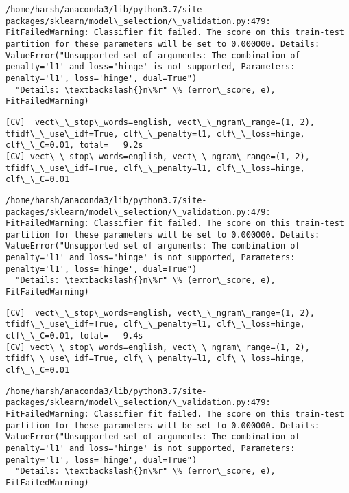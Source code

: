 \documentclass[11pt]{article}
\begin{document}
    \begin{Verbatim}[commandchars=\\\{\}]
/home/harsh/anaconda3/lib/python3.7/site-packages/sklearn/model\_selection/\_validation.py:479: FitFailedWarning: Classifier fit failed. The score on this train-test partition for these parameters will be set to 0.000000. Details: 
ValueError("Unsupported set of arguments: The combination of penalty='l1' and loss='hinge' is not supported, Parameters: penalty='l1', loss='hinge', dual=True")
  "Details: \textbackslash{}n\%r" \% (error\_score, e), FitFailedWarning)

    \end{Verbatim}

    \begin{Verbatim}[commandchars=\\\{\}]
[CV]  vect\_\_stop\_words=english, vect\_\_ngram\_range=(1, 2), tfidf\_\_use\_idf=True, clf\_\_penalty=l1, clf\_\_loss=hinge, clf\_\_C=0.01, total=   9.2s
[CV] vect\_\_stop\_words=english, vect\_\_ngram\_range=(1, 2), tfidf\_\_use\_idf=True, clf\_\_penalty=l1, clf\_\_loss=hinge, clf\_\_C=0.01 

    \end{Verbatim}

    \begin{Verbatim}[commandchars=\\\{\}]
/home/harsh/anaconda3/lib/python3.7/site-packages/sklearn/model\_selection/\_validation.py:479: FitFailedWarning: Classifier fit failed. The score on this train-test partition for these parameters will be set to 0.000000. Details: 
ValueError("Unsupported set of arguments: The combination of penalty='l1' and loss='hinge' is not supported, Parameters: penalty='l1', loss='hinge', dual=True")
  "Details: \textbackslash{}n\%r" \% (error\_score, e), FitFailedWarning)

    \end{Verbatim}

    \begin{Verbatim}[commandchars=\\\{\}]
[CV]  vect\_\_stop\_words=english, vect\_\_ngram\_range=(1, 2), tfidf\_\_use\_idf=True, clf\_\_penalty=l1, clf\_\_loss=hinge, clf\_\_C=0.01, total=   9.4s
[CV] vect\_\_stop\_words=english, vect\_\_ngram\_range=(1, 2), tfidf\_\_use\_idf=True, clf\_\_penalty=l1, clf\_\_loss=hinge, clf\_\_C=0.01 

    \end{Verbatim}

    \begin{Verbatim}[commandchars=\\\{\}]
/home/harsh/anaconda3/lib/python3.7/site-packages/sklearn/model\_selection/\_validation.py:479: FitFailedWarning: Classifier fit failed. The score on this train-test partition for these parameters will be set to 0.000000. Details: 
ValueError("Unsupported set of arguments: The combination of penalty='l1' and loss='hinge' is not supported, Parameters: penalty='l1', loss='hinge', dual=True")
  "Details: \textbackslash{}n\%r" \% (error\_score, e), FitFailedWarning)

    \end{Verbatim}
\end{document}
